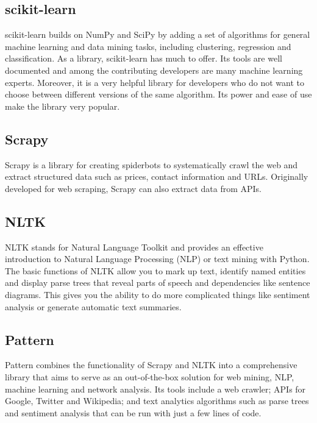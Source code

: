 \subsection{scikit-learn}

scikit-learn builds on NumPy and SciPy by adding a set of algorithms for general machine learning and data mining tasks, including clustering, regression and classification. As a library, scikit-learn has much to offer. Its tools are well documented and among the contributing developers are many machine learning experts. Moreover, it is a very helpful library for developers who do not want to choose between different versions of the same algorithm. Its power and ease of use make the library very popular.



\subsection{Scrapy}

Scrapy is a library for creating spiderbots to systematically crawl the web and extract structured data such as prices, contact information and URLs. Originally developed for web scraping, Scrapy can also extract data from APIs.

\subsection{NLTK}

NLTK stands for Natural Language Toolkit and provides an effective introduction to Natural Language Processing (NLP) or text mining with Python.
The basic functions of NLTK allow you to mark up text, identify named entities and display parse trees that reveal parts of speech and dependencies like sentence diagrams. This gives you the ability to do more complicated things like sentiment analysis or generate automatic text summaries.




 
\subsection{Pattern}

Pattern combines the functionality of Scrapy and NLTK into a comprehensive library that aims to serve as an out-of-the-box solution for web mining, NLP, machine learning and network analysis. Its tools include a web crawler; APIs for Google, Twitter and Wikipedia; and text analytics algorithms such as parse trees and sentiment analysis that can be run with just a few lines of code.


